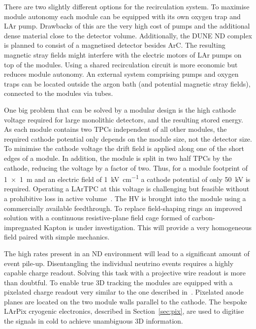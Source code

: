\documentclass[a4paper]{article}
\begin{document}
There are two slightly different options for the recirculation system.
To maximise module autonomy each module can be equipped with its own oxygen trap and LAr pump.
Drawbacks of this are the very high cost of pumps and the additional dense material close to the detector volume.
Additionally, the DUNE ND complex is planned to consist of a magnetised detector besides ArC.
The resulting magnetic stray fields might interfere with the electric motors of LAr pumps on top of the modules.
Using a shared recirculation circuit is more economic but reduces module autonomy.
An external system comprising pumps and oxygen traps can be located outside the argon bath (and potential magnetic stray fields), connected to the modules via tubes.

One big problem that can be solved by a modular design is the high cathode voltage required for large monolithic detectors, and the resulting stored energy.
As each module contains two TPCs independent of all other modules, the required cathode potential only depends on the module size, not the detector size.
To minimise the cathode voltage the drift field is applied along one of the short edges of a module.
In addition, the module is split in two half TPCs by the cathode, reducing the voltage by a factor of two.
Thus, for a module footprint of \SI{1 x 1}{\metre} and an electric field of \SI{1}{\kilo\volt\per\centi\metre} a cathode potential of only \SI{50}{\kilo\volt} is required.
Operating a LArTPC at this voltage is challenging but feasible without a prohibitive loss in active volume~\cite{AT}.
The HV is brought into the module using a commercially available feedthrough.
To replace field-shaping rings an improved solution with a continuous resistive-plane field cage formed of carbon-impregnated Kapton is under investigation.
This will provide a very homogeneous field paired with simple mechanics.

The high rates present in an ND environment will lead to a significant amount of event pile-up.
Disentangling the individual neutrino events requires a highly capable charge readout.
Solving this task with a projective wire readout is more than doubtful.
To enable true 3D tracking the modules are equipped with a pixelated charge readout very similar to the one described in~\cite{pixels}.
Pixelated anode planes are located on the two module walls parallel to the cathode.
The bespoke LArPix cryogenic electronics, described in Section~\ref{sec:pix}, are used to digitise the signals in cold to achieve unambiguous 3D information.
\end{document}
